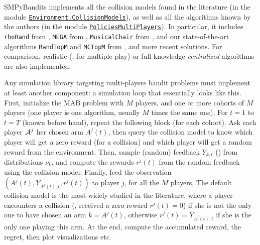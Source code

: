 SMPyBandits implements all the collision models found in the literature (in the module \texttt{\href{https://SMPyBandits.GitHub.io/docs/Environment.CollisionModels.html}{Environment.CollisionModels}}), as well as all the algorithms known by the authors (in the module \texttt{\href{https://SMPyBandits.GitHub.io/docs/PoliciesMultiPlayers.html}{PoliciesMultiPlayers}}).
%
In particular, it includes
\texttt{rhoRand}
from \cite{Anandkumar11},
\texttt{MEGA}
from \cite{Avner15},
\texttt{MusicalChair}
from \cite{Rosenski16},
and our state-of-the-art algorithms
\texttt{RandTopM}
and \texttt{MCTopM}
from \cite{Besson2018ALT}, and more recent solutions.
For comparison, realistic (\eg, \UCB{} for multiple play) or full-knowledge \emph{centralized} algorithms are also implemented.

Any simulation library targeting multi-players bandit problems must implement at least another component:
a simulation loop that essentially looks like this.
    First, initialize the MAB problem with $M$ players, and one or more cohorts of $M$ players (one player is one algorithm, usually $M$ times the same one),
    For $t=1$ to $t=T$ (known before hand), repeat the following block (for each cohort). Ask each player $\mathcal{A}^j$ her chosen arm $A^j(t)$, then query the collision model to know which player will get a zero reward (for a collision) and which player will get a random reward from the environment.
    Then, sample (random) feedback $Y_{k,t}$ (\iid) from distributions $\nu_{k}$, and compute the rewards $r^j(t)$ from the random feedback using the collision model.
    Finally, feed the observation $(A^j(t), Y_{A^j(t),t}, r^j(t))$ to player $j$, for all the $M$ players,
    The default collision model is the most widely studied in the literature, where a player encounters a collision (\ie, received a zero reward $r^j(t)=0$) if she is not the only one to have chosen an arm $k=A^j(t)$, otherwise $r^j(t)=Y_{A^j(t),t}$ if she is the only one playing this arm.
    At the end, compute the accumulated reward, the regret, then plot visualizations etc.


